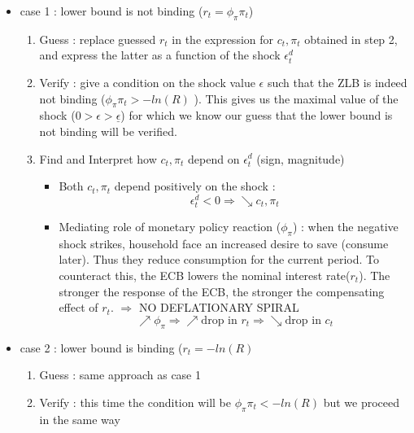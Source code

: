 \documentclass{article}
\begin{document}
\begin{itemize}
    \item case 1 : lower bound is not binding ($r_t = \phi_\pi \pi_t$)
    \begin{enumerate}
        \item Guess : replace guessed $r_t$ in the expression for $c_t, \pi_t$ obtained in step 2, and express the latter as a function of the shock $\epsilon_t^d$
        \item Verify : give a condition on the shock value $\epsilon$ such that the ZLB is indeed not binding ($\phi_\pi \pi_t > -ln(R)$ ). This gives us the maximal value of the shock ($0>\epsilon > \underline{\epsilon}$) for which we know our guess that the lower bound is not binding will be verified.
        \item Find and Interpret how $c_t,\pi_t$ depend on $\epsilon_t^d$ (sign, magnitude)
        \begin{interpretationbox}
            \begin{itemize}
                \item Both $c_t,\pi_t$ depend positively on the shock : 
                \begin{equation}
                    \epsilon_t^d <0 \Longrightarrow \searrow c_t,\pi_t
                \end{equation}
                \item Mediating role of monetary policy reaction ($\phi_\pi$) : when the negative shock strikes, household face an increased desire to save (consume later). Thus they reduce consumption for the current period. To counteract this, the ECB lowers the nominal interest rate($r_t$). The stronger the response of the ECB, the stronger the compensating effect of $r_t$. $\Longrightarrow$ NO DEFLATIONARY SPIRAL
                \begin{equation}
                    \nearrow \phi_\pi \Longrightarrow \nearrow \text{drop in }r_t  \Longrightarrow \searrow \text{drop in } c_t
                \end{equation}
            \end{itemize}
        \end{interpretationbox} 
    \end{enumerate}
    \item case 2 : lower bound is binding ($r_t=-ln(R)$
    \begin{enumerate}
        \item Guess : same approach as case 1 
        \item Verify : this time the condition will be $\phi_\pi \pi_t < -ln(R)$ but we proceed in the same way

\end{enumerate}
\end{itemize}
\end{document}
